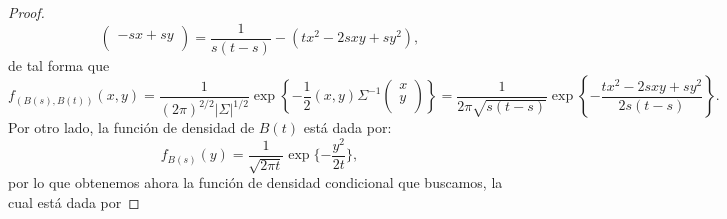 \documentclass[letterpaper]{article}
\newcommand{\1}{\mathds{1}}
\theoremstyle{definition}
\theoremstyle{definition}
\theoremstyle{definition}
\theoremstyle{definition}
\theoremstyle{definition}
\begin{document}
\begin{enumerate}
\begin{proof}
\[\begin{pmatrix}
            -sx+sy\\
        \end{pmatrix}
        =\frac{1}{s(t-s)}-(tx^2-2sxy+sy^2),
     \]
     de tal forma que
     \[
        f_{\left(B(s),B(t)\right)}(x,y)=\frac{1}{(2\pi)^{2/2}|\Sigma|^{1/2}}\exp\left\{-\frac{1}{2}(x,y)\Sigma^{-1}\begin{pmatrix}
           x\\
           y\\
        \end{pmatrix}\right\}  
        = \frac{1}{2\pi\sqrt{s(t-s)}}\exp\left\{-\frac{tx^2-2sxy+sy^2}{2s(t-s)}\right\}.
        \] 
        Por otro lado, la función de densidad de $B(t)$ está dada por:
        \[
        f_{B(s)}(y)=\frac{1}{\sqrt{2\pi t}}\exp\{-\frac{y^2}{2t}\},    
        \]
        por lo que obtenemos ahora la función de densidad condicional que buscamos, la cual está dada por
        

\end{proof}
\end{enumerate}
\end{document}
